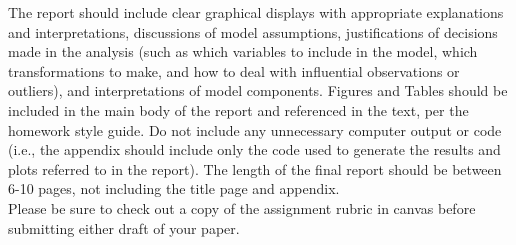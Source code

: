 \documentclass[12pt]{report}
\begin{document}
The report should include clear graphical displays with appropriate
explanations and interpretations, discussions of model assumptions,
justifications of decisions made in the analysis (such as which
variables to include in the model, which transformations to make,
and how to deal with influential observations or outliers), and interpretations of model
components. Figures and Tables should be included in the main body
of the report and referenced in the text, per the homework style guide.  Do not include any unnecessary computer output or
code (i.e., the appendix should include only the code used to
generate the results and plots referred to in the report).  The length of the final report should be between 6-10 pages, not including the title page and appendix.\\

Please be sure to check out a copy of the assignment rubric in canvas before submitting either draft of your paper. 
\end{document}
